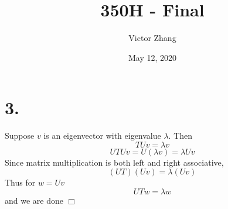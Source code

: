 \documentclass{article}
\title{350H - Final}
\author{Victor Zhang}
\date{May 12, 2020}
\begin{document}
\maketitle

\section*{3.}
Suppose $v$ is an eigenvector with eigenvalue $\lambda$. Then
$$TUv = \lambda v$$
$$UTUv = U(\lambda v) = \lambda Uv$$
Since matrix multiplication is both left and right associative,
$$(UT)(Uv) = \lambda (Uv)$$
Thus for $w = Uv$
$$UTw = \lambda w$$
and we are done $\Box$
\end{document}
